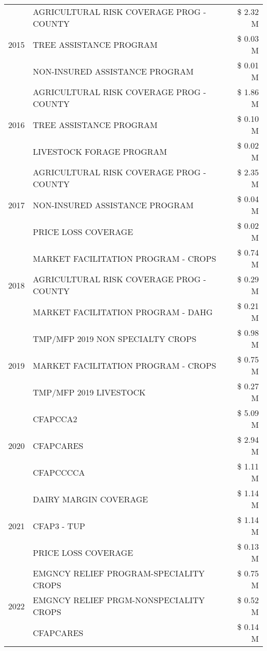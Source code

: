 \begin{tabular}{llr}
\cline{1-3}
\multirow[t]{3}{*}{2015} & AGRICULTURAL RISK COVERAGE PROG - COUNTY & \$ 2.32 M \\
 & TREE ASSISTANCE PROGRAM & \$ 0.03 M \\
 & NON-INSURED ASSISTANCE PROGRAM & \$ 0.01 M \\
\cline{1-3}
\multirow[t]{3}{*}{2016} & AGRICULTURAL RISK COVERAGE PROG - COUNTY & \$ 1.86 M \\
 & TREE ASSISTANCE PROGRAM & \$ 0.10 M \\
 & LIVESTOCK FORAGE PROGRAM & \$ 0.02 M \\
\cline{1-3}
\multirow[t]{3}{*}{2017} & AGRICULTURAL RISK COVERAGE PROG - COUNTY & \$ 2.35 M \\
 & NON-INSURED ASSISTANCE PROGRAM & \$ 0.04 M \\
 & PRICE LOSS COVERAGE & \$ 0.02 M \\
\cline{1-3}
\multirow[t]{3}{*}{2018} & MARKET FACILITATION PROGRAM - CROPS & \$ 0.74 M \\
 & AGRICULTURAL RISK COVERAGE PROG - COUNTY & \$ 0.29 M \\
 & MARKET FACILITATION PROGRAM - DAHG & \$ 0.21 M \\
\cline{1-3}
\multirow[t]{3}{*}{2019} & TMP/MFP 2019 NON SPECIALTY CROPS & \$ 0.98 M \\
 & MARKET FACILITATION PROGRAM - CROPS & \$ 0.75 M \\
 & TMP/MFP 2019 LIVESTOCK & \$ 0.27 M \\
\cline{1-3}
\multirow[t]{3}{*}{2020} & CFAPCCA2 & \$ 5.09 M \\
 & CFAPCARES & \$ 2.94 M \\
 & CFAPCCCCA & \$ 1.11 M \\
\cline{1-3}
\multirow[t]{3}{*}{2021} & DAIRY MARGIN COVERAGE & \$ 1.14 M \\
 & CFAP3 - TUP & \$ 1.14 M \\
 & PRICE LOSS COVERAGE & \$ 0.13 M \\
\cline{1-3}
\multirow[t]{3}{*}{2022} & EMGNCY RELIEF PROGRAM-SPECIALITY CROPS & \$ 0.75 M \\
 & EMGNCY RELIEF PRGM-NONSPECIALITY CROPS & \$ 0.52 M \\
 & CFAPCARES & \$ 0.14 M \\
\cline{1-3}
\bottomrule
\end{tabular}
